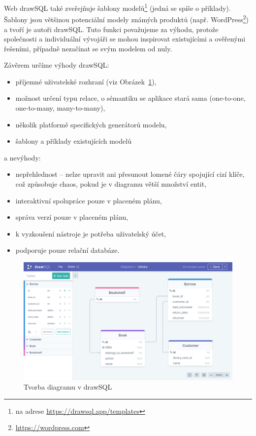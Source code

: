 Web drawSQL také zveřejňuje šablony modelů\footnote{na adrese \url{https://drawsql.app/templates}} (jedná se spíše o příklady).
Šablony jsou většinou potenciální modely známých produktů (např. WordPress\footnote{\url{https://wordpress.com}}) a tvoří je autoři drawSQL.
Tuto funkci považujeme za výhodu, protože společnosti a individuální vývojáři se mohou inspirovat existujícími a ověřenými řešeními, případně nezačínat se svým modelem od nuly.

Závěrem určíme výhody drawSQL:
\begin{itemize}
  \item příjemné uživatelské rozhraní (viz Obrázek~\ref{fig:drawsql}),
  \item možnost určení typu relace, o sémantiku se aplikace stará sama (one-to-one, one-to-many, many-to-many),
  \item několik platformě specifických generátorů modelu,
  \item šablony a příklady existujících modelů
\end{itemize}
a nevýhody:
\begin{itemize}
  \item nepřehlednost -- nelze upravit ani přesunout lomené čáry spojující cizí klíče, což způsobuje chaos, pokud je v diagramu větší množství entit,
  \item interaktivní spolupráce pouze v placeném plánu,
  \item správa verzí pouze v placeném plánu,
  \item k vyzkoušení nástroje je potřeba uživatelský účet,
  \item podporuje pouze relační databáze.
\end{itemize}

\begin{figure}[!htb]
  \centering
  \includegraphics[width = \maxwidth{\textwidth}]{../img/drawsql.png}
  \caption{Tvorba diagramu v drawSQL}
  \label{fig:drawsql}
\end{figure}

